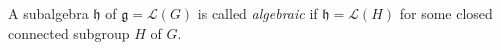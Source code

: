 A subalgebra $\mathfrak{h}$ of $\mathfrak{g} = \mathcal{L}(G)$ is called \emph{algebraic} if $\mathfrak{h} = \mathcal{L}(H)$ for some closed connected subgroup $H$ of $G$.
